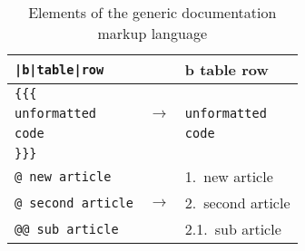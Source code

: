 {\begin{table}
\begin{tabular}{@{}lcl@{}}
\texttt{|b|table|row} & & b \enspace table \enspace row \\
\midrule
\texttt{\{\{\{} \\
\texttt{unformatted} & $\rightarrow$ & \texttt{unformatted} \\
\texttt{code} & & \texttt{code} \\
\texttt{\}\}\}} \\
\midrule\addlinespace
\texttt{@ new article} & & {\Large 1.\ new article} \smallskip \\
\texttt{@ second article} & $\rightarrow$ & {\Large 2.\ second article} \smallskip \\
\texttt{@@ sub article} & & {\large 2.1.\ sub article} \\
\bottomrule
\end{tabular}
\normalfont\caption{Elements of the generic documentation markup language}
\label{tab:docmarkup}
\end{table}
}

\providecommand{\startchapter}[4]{
\documentclass[11pt,a4paper]{article}
\usepackage{booktabs}
\usepackage[format=hang,labelfont=bf]{caption}
\usepackage{changepage}
\usepackage[T1]{fontenc}
\usepackage[margin=2cm]{geometry}
\usepackage{hyperref}
\usepackage[american]{isodate}
\usepackage{lmodern}
\usepackage{longtable}
\usepackage{mathptmx}
\usepackage{microtype}
\usepackage[toc]{multitoc}
\usepackage{multirow}
\usepackage[all]{nowidow}
\usepackage{pdfcomment}
\usepackage{syntax}
\usepackage{tikz}
\usepackage[all]{xy}
\hypersetup{pdfborder={0 0 0},bookmarksnumbered=true,pdftitle={\ecs{}: #2},pdfauthor={Florian Negele},pdfsubject={\ecs{}},pdfkeywords={#1}}
\setlength{\grammarindent}{8em}\setlength{\grammarparsep}{0.2ex}
\setlength{\columnsep}{2em}
\newcommand{\prefix}{}
\newcounter{instruction}

\renewcommand{\index}[2][]{}
\renewcommand{\arraystretch}{1.05}
\renewcommand{\floatpagefraction}{0.7}
\renewcommand{\syntleft}{\itshape}\renewcommand{\syntright}{}
\title{\vspace{-5ex}\Huge{\ecs{}}\medskip\hrule}
\author{\huge{#2}}
\date{\medskip\version}
\newif\ifbook\bookfalse
\pagestyle{headings}
\frenchspacing

\maketitle\thispagestyle{empty}\noindent#4\setlength{\columnseprule}{0.4pt}\tableofcontents\setlength{\columnseprule}{0pt}\vfill\pagebreak[3]\null\vfill\bigskip\noindent
\parbox{\textwidth-4em}{\license The contents of this \documentation{} are part of the \href{manual}{\ecs{} User Manual}~\cite{manual} and correspond to Chapter ``\href{manual\##3}{#1}''.\alignright\mbox{\today}}
\parbox{4em}{\flushright\ecslogo{3em}}
\clearpage
}

